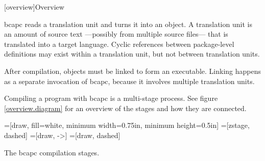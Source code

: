 [overview]{Overview}

bcapc reads
a translation unit
and turns it
into an object.
A translation unit
is an amount of source text%
---possibly from multiple source files---%
that is translated
into a target language.
Cyclic references
between package-level definitions
may exist within a translation unit,
but not between translation units.

After compilation,
objects must be linked
to form an executable.
Linking happens
as a separate invocation
of bcapc,
because it involves
multiple translation units.

Compiling a program with bcapc
is a multi-stage process.
See figure \ref{overview.diagram}
for an overview
of the stages
and how they are connected.

=[draw, fill=white, minimum width=0.75in, minimum height=0.5in]
=[zstage, dashed]
=[draw, ->]
=[draw, dashed]

\begin{zfigure}{The bcapc compilation stages.}
    \label{overview.diagram}
    \begin{center}
        \vspace{4pt}
    \end{center}
\end{zfigure}
